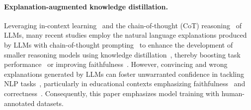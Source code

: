 \paragraph{Explanation-augmented knowledge distillation.}
Leveraging in-context learning~\citep{brown2020language} and the chain-of-thought (CoT) reasoning~\citep{chu2023survey} of LLMs, many recent studies employ the natural language explanations produced by LLMs with chain-of-thought prompting~\citep{lampinen-etal-2022-language,li2023symbolic} to enhance the development of smaller reasoning models using knowledge distillation~\citep{zhang2024elad}, thereby boosting task performance~\citep{li2024explanations,ho-etal-2023-large,hsieh-etal-2023-distilling} or improving faithfulness~\citep{wang-etal-2023-scott}.
However, convincing and wrong explanations generated by LLMs can foster unwarranted confidence in tackling NLP tasks~\citep{madsen-etal-2024-self,pruthi-etal-2022-evaluating}, particularly in educational contexts emphasizing faithfulness~\citep{lyu-etal-2024-towards} and correctness~\citep{huang-etal-2024-chatgpt}. Consequently, this paper emphasizes model training with human-annotated datasets.
